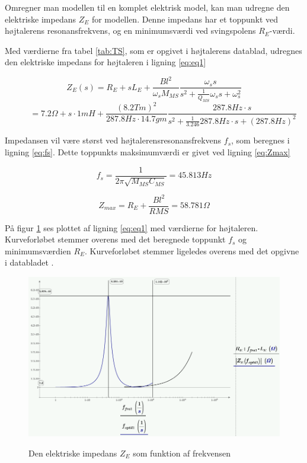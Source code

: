 Omregner man modellen til en komplet elektrisk model, kan man udregne den elektriske impedans $Z_E$ for modellen. Denne impedans har et toppunkt ved højtalerens resonansfrekvens, og en minimumsværdi ved svingspolens $R_E$-værdi. 

Med værdierne fra tabel \ref{tab:TS}, som er opgivet i højtalerens datablad\cite{FW168}, udregnes den elektriske impedans for højtaleren i ligning \ref{eq:eq1}

\begin{equation}\label{eq:eq1}
	Z_E(s)=R_E+sL_E+\frac{Bl^2}{\omega_s M_{MS}} \frac{ \omega_s s}{ s^2 + \frac{1}{Q_{MS}} \omega_s s + \omega_s^2} \end{equation} \begin{equation} \ \qquad  = 
	7.2\Omega + s \cdot 1mH + \frac{(8.2 Tm)^2}{287.8Hz \cdot 14.7gm} \frac{ 287.8Hz \cdot s}{ s^2 + \frac{1}{3.246} 287.8Hz \cdot s + (287.8Hz)^2}  \end{equation}

Impedansen vil være størst ved højtalerensresonansfrekvens $f_s$, som beregnes i ligning \ref{eq:fs}. Dette toppunkts maksimumværdi er givet ved ligning \ref{eq:Zmax} 

\begin{equation}\label{eq:fs}
	f_s=\frac{1}{2 \pi \sqrt{M_{MS} C_{MS}}}=45.813Hz
\end{equation}

\begin{equation}\label{eq:Zmax}
	Z_{max}=R_E+\frac{Bl^2}{R{MS}}=58.781\Omega
\end{equation}

På figur \ref{fig:ZE_graf}  ses plottet af ligning \ref{eq:eq1} med værdierne for højtaleren. Kurveforløbet stemmer overens med det beregnede toppunkt $f_s$ og minimumsværdien $R_E$. Kurveforløbet stemmer ligeledes overens med det opgivne i databladet \citep{FW168}.

\begin{figure}[H]
	\centering
	\includegraphics[width=\textwidth]{Pics/ZE_graf.PNG}
	\label{fig:ZE_graf}
	\caption{Den elektriske impedans $Z_E$ som funktion af frekvensen} 
\end{figure}
